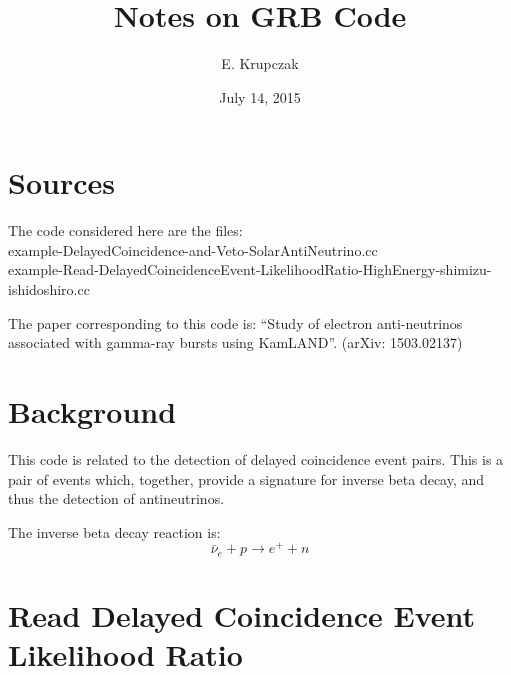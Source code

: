 \documentclass{article}
\title{Notes on GRB Code}
\author{E. Krupczak}
\date{July 14, 2015}
\begin{document}
\maketitle

\section{Sources}
The code considered here are the files:
\\ example-DelayedCoincidence-and-Veto-SolarAntiNeutrino.cc
\\ example-Read-DelayedCoincidenceEvent-LikelihoodRatio-HighEnergy-shimizu-ishidoshiro.cc

The paper corresponding to this code is:
``Study of electron anti-neutrinos associated with gamma-ray bursts using KamLAND''. (arXiv: 1503.02137) 

\section{Background}
This code is related to the detection of delayed coincidence event pairs. This is a pair of events which, together, provide a signature for inverse beta decay, and thus the detection of antineutrinos. 

The inverse beta decay reaction is: 
$$\bar \nu_e + p \rightarrow e^+ +n$$


\section{Read Delayed Coincidence Event Likelihood Ratio}
\end{document}
